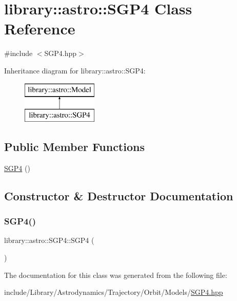 \hypertarget{classlibrary_1_1astro_1_1_s_g_p4}{}\section{library\+:\+:astro\+:\+:S\+G\+P4 Class Reference}
\label{classlibrary_1_1astro_1_1_s_g_p4}


{\ttfamily \#include $<$S\+G\+P4.\+hpp$>$}

Inheritance diagram for library\+:\+:astro\+:\+:S\+G\+P4\+:\begin{figure}[H]
\begin{center}
\leavevmode
\includegraphics[height=2.000000cm]{classlibrary_1_1astro_1_1_s_g_p4}
\end{center}
\end{figure}
\subsection*{Public Member Functions}
\begin{DoxyCompactItemize}
\item 
\hyperlink{classlibrary_1_1astro_1_1_s_g_p4_a6fb4e1119ce84877ba141a92a3c57b9c}{S\+G\+P4} ()
\end{DoxyCompactItemize}


\subsection{Constructor \& Destructor Documentation}
\mbox{\label{classlibrary_1_1astro_1_1_s_g_p4_a6fb4e1119ce84877ba141a92a3c57b9c}} 
\subsubsection{\texorpdfstring{S\+G\+P4()}{SGP4()}}
{\footnotesize\ttfamily library\+::astro\+::\+S\+G\+P4\+::\+S\+G\+P4 (\begin{DoxyParamCaption}{ }\end{DoxyParamCaption})}



The documentation for this class was generated from the following file\+:\begin{DoxyCompactItemize}
\item 
include/\+Library/\+Astrodynamics/\+Trajectory/\+Orbit/\+Models/\hyperlink{_s_g_p4_8hpp}{S\+G\+P4.\+hpp}\end{DoxyCompactItemize}
